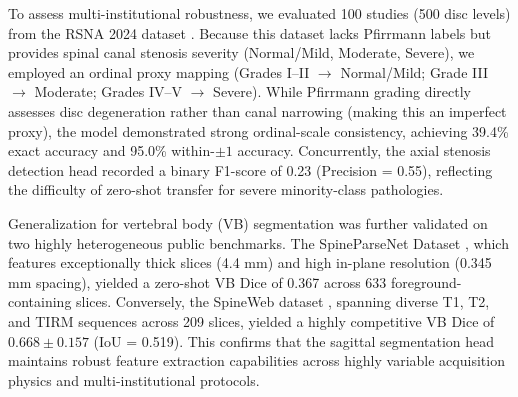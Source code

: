 \documentclass[journal]{IEEEtran}
\begin{document}
To assess multi-institutional robustness, we evaluated 100 studies (500 disc levels) from the RSNA 2024 dataset \cite{rsna_lumbar_2026}. Because this dataset lacks Pfirrmann labels but provides spinal canal stenosis severity (Normal/Mild, Moderate, Severe), we employed an ordinal proxy mapping (Grades I--II $\to$ Normal/Mild; Grade III $\to$ Moderate; Grades IV--V $\to$ Severe). While Pfirrmann grading directly assesses disc degeneration rather than canal narrowing (making this an imperfect proxy), the model demonstrated strong ordinal-scale consistency, achieving 39.4\% exact accuracy and 95.0\% within-$\pm 1$ accuracy. Concurrently, the axial stenosis detection head recorded a binary F1-score of 0.23 (Precision = 0.55), reflecting the difficulty of zero-shot transfer for severe minority-class pathologies.

Generalization for vertebral body (VB) segmentation was further validated on two highly heterogeneous public benchmarks. The SpineParseNet Dataset \cite{spineparsenet2021}, which features exceptionally thick slices (4.4 mm) and high in-plane resolution (0.345 mm spacing), yielded a zero-shot VB Dice of 0.367 across 633 foreground-containing slices. Conversely, the SpineWeb dataset \cite{spineweb2012}, spanning diverse T1, T2, and TIRM sequences across 209 slices, yielded a highly competitive VB Dice of $0.668 \pm 0.157$ (IoU = 0.519). This confirms that the sagittal segmentation head maintains robust feature extraction capabilities across highly variable acquisition physics and multi-institutional protocols.


\end{document}
